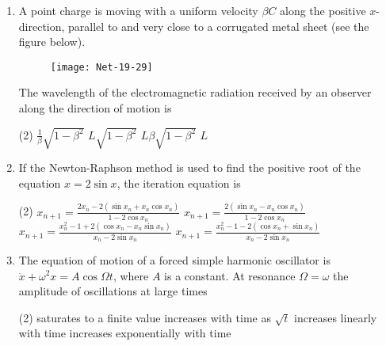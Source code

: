 \begin{enumerate}
 \begin{tasks}(4)
	\task[\textbf{a.}]$-2 \alpha$ and $\alpha$
	\task[\textbf{b.}] $2 \alpha$ and $-\alpha$
	\task[\textbf{c.}] $\alpha$ and $-2 \alpha$
	\task[\textbf{d.}] $-\alpha$ and $2 \alpha$
\end{tasks}
\item  A point charge is moving with a uniform velocity $\beta C$ along the positive $x$-direction, parallel to and very close to a corrugated metal sheet (see the figure below).
\begin{figure}[H]
	\centering
	\texttt{[image: Net-19-29]}
\end{figure}
The wavelength of the electromagnetic radiation received by an observer along the direction of motion is
 \begin{tasks}(2)
	\task[\textbf{a.}]$\frac{1}{\beta} \sqrt{1-\beta^{2}}$
	\task[\textbf{b.}]$L \sqrt{1-\beta^{2}}$
	\task[\textbf{c.}]$L \beta \sqrt{1-\beta^{2}}$
	\task[\textbf{d.}] $L$
\end{tasks}
\item If the Newton-Raphson method is used to find the positive root of the equation $x=2 \sin x$, the iteration equation is
 \begin{tasks}(2)
	\task[\textbf{a.}]$x_{n+1}=\frac{2 x_{n}-2\left(\sin x_{n}+x_{n} \cos x_{n}\right)}{1-2 \cos x_{n}}$
	\task[\textbf{b.}]$x_{n+1}=\frac{2\left(\sin x_{n}-x_{n} \cos x_{n}\right)}{1-2 \cos x_{n}}$
	\task[\textbf{c.}] $x_{n+1}=\frac{x_{n}^{2}-1+2\left(\cos x_{n}-x_{n} \sin x_{n}\right)}{x_{n}-2 \sin x_{n}}$
	\task[\textbf{d.}]  $x_{n+1}=\frac{x_{n}^{2}-1-2\left(\cos x_{n}+\sin x_{n}\right)}{x_{n}-2 \sin x_{n}}$
\end{tasks}
\item  The equation of motion of a forced simple harmonic oscillator is $\ddot{x}+\omega^{2} x=A \cos \Omega t$, where $A$ is a constant. At resonance $\Omega=\omega$ the amplitude of oscillations at large times
 \begin{tasks}(2)
	\task[\textbf{a.}]saturates to a finite value
	\task[\textbf{b.}] increases with time as $\sqrt{t}$
	\task[\textbf{c.}] increases linearly with time
	\task[\textbf{d.}]  increases exponentially with time
\end{tasks}

\end{enumerate}
